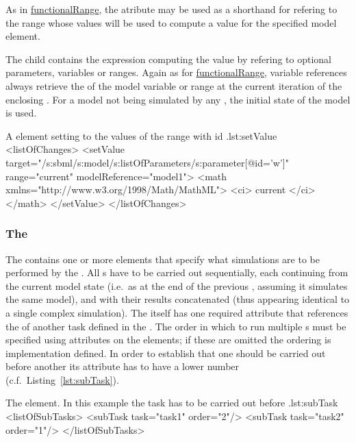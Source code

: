 As in \hyperref[class:functionalRange]{functionalRange}, the atribute  may be used as a shorthand for refering to the range whose values will be used to compute a value for the specified model element.

The child  contains the expression computing the value by refering to optional parameters, variables or ranges.
Again as for \hyperref[class:functionalRange]{functionalRange}, variable references always retrieve the  of the model variable or range at the current iteration of the enclosing .
For a model not being simulated by any , the initial state of the model is used.

\begin{myXmlLst}{A  element setting  to the values of the range with id .}{lst:setValue}
  <listOfChanges>
    <setValue target="/s:sbml/s:model/s:listOfParameters/s:parameter[@id='w']"
              range="current" modelReference="model1">
      <math xmlns="http://www.w3.org/1998/Math/MathML">
        <ci> current </ci>
      </math>
    </setValue>
  </listOfChanges>
\end{myXmlLst}


\subsubsection{The }
\label{class:subTask}

The  contains one or more  elements that specify what simulations are to be performed by the .
All s have to be carried out sequentially, each continuing from the current model state (i.e.\ as at the end of the previous , assuming it simulates the same model), and with their results concatenated (thus appearing identical to a single complex simulation).
The  itself has one required attribute  that references the  of another task defined in the .
The order in which to run multiple s must be specified using  attributes on the  elements; if these are omitted the ordering is implementation defined.
In order to establish that one  should be carried out before another its  attribute has to have a lower number (c.f.\ Listing~\ref{lst:subTask}).

\begin{myXmlLst}{The  element. In this example the task  has to be carried out before .}{lst:subTask}
  <listOfSubTasks>
    <subTask task="task1" order="2"/> 
    <subTask task="task2" order="1"/> 
  </listOfSubTasks>
\end{myXmlLst}

 


